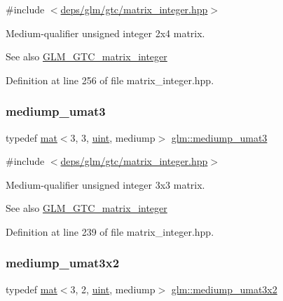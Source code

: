 {\ttfamily \#include $<$\hyperlink{matrix__integer_8hpp}{deps/glm/gtc/matrix\+\_\+integer.\+hpp}$>$}

Medium-\/qualifier unsigned integer 2x4 matrix. \begin{DoxySeeAlso}{See also}
\hyperlink{group__gtc__matrix__integer}{G\+L\+M\+\_\+\+G\+T\+C\+\_\+matrix\+\_\+integer} 
\end{DoxySeeAlso}


Definition at line 256 of file matrix\+\_\+integer.\+hpp.

\mbox{\label{group__gtc__matrix__integer_gaa677ebd95702fc95054de7a4fb4c907f}} 
\subsubsection{\texorpdfstring{mediump\+\_\+umat3}{mediump\_umat3}}
{\footnotesize\ttfamily typedef \hyperlink{structglm_1_1mat}{mat}$<$3, 3, \hyperlink{group__core__precision_ga4fd29415871152bfb5abd588334147c8}{uint}, mediump$>$ \hyperlink{group__gtc__matrix__integer_gaa677ebd95702fc95054de7a4fb4c907f}{glm\+::mediump\+\_\+umat3}}



{\ttfamily \#include $<$\hyperlink{matrix__integer_8hpp}{deps/glm/gtc/matrix\+\_\+integer.\+hpp}$>$}

Medium-\/qualifier unsigned integer 3x3 matrix. \begin{DoxySeeAlso}{See also}
\hyperlink{group__gtc__matrix__integer}{G\+L\+M\+\_\+\+G\+T\+C\+\_\+matrix\+\_\+integer} 
\end{DoxySeeAlso}


Definition at line 239 of file matrix\+\_\+integer.\+hpp.

\mbox{\label{group__gtc__matrix__integer_gad27333d041d86c7b0b78010c5a437846}} 
\subsubsection{\texorpdfstring{mediump\+\_\+umat3x2}{mediump\_umat3x2}}
{\footnotesize\ttfamily typedef \hyperlink{structglm_1_1mat}{mat}$<$3, 2, \hyperlink{group__core__precision_ga4fd29415871152bfb5abd588334147c8}{uint}, mediump$>$ \hyperlink{group__gtc__matrix__integer_gad27333d041d86c7b0b78010c5a437846}{glm\+::mediump\+\_\+umat3x2}}



